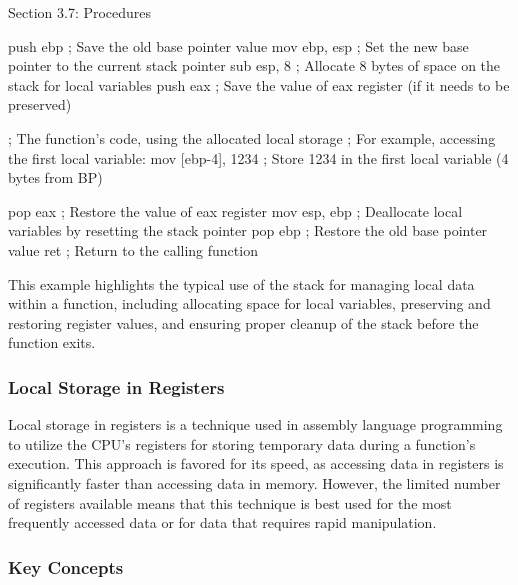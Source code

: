 \begin{notes}{Section 3.7: Procedures}
\begin{highlight}
    \begin{code}[Assembly]
    push ebp                ; Save the old base pointer value
    mov ebp, esp            ; Set the new base pointer to the current stack pointer
    sub esp, 8              ; Allocate 8 bytes of space on the stack for local variables
    push eax                ; Save the value of eax register (if it needs to be preserved)

    ; The function's code, using the allocated local storage
    ; For example, accessing the first local variable:
    mov [ebp-4], 1234       ; Store 1234 in the first local variable (4 bytes from BP)

    pop eax                 ; Restore the value of eax register
    mov esp, ebp            ; Deallocate local variables by resetting the stack pointer
    pop ebp                 ; Restore the old base pointer value
    ret                     ; Return to the calling function
    \end{code}
    
        This example highlights the typical use of the stack for managing local data within a function, including allocating space for local variables, preserving and restoring register values, and 
        ensuring proper cleanup of the stack before the function exits.
    \end{highlight}

    \subsubsection*{Local Storage in Registers}

    Local storage in registers is a technique used in assembly language programming to utilize the CPU's registers for storing temporary data during a function's execution. This approach is favored 
    for its speed, as accessing data in registers is significantly faster than accessing data in memory. However, the limited number of registers available means that this technique is best used for 
    the most frequently accessed data or for data that requires rapid manipulation.
    
    \subsubsection*{Key Concepts}
    

\end{notes}
